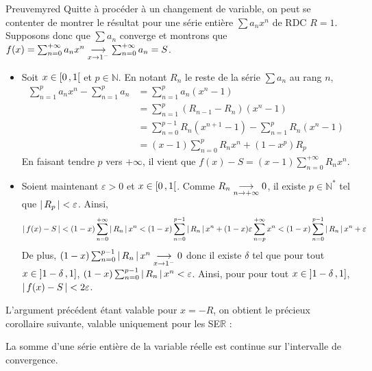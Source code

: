     \begin{demo}{Preuve}{myred}
        Quitte à procéder à un changement de variable, on peut se contenter de montrer le résultat pour une série entière $\sum a_n x^n$ de RDC $R = 1$. Supposons donc que $\sum a_n$ converge et montrons que $f(x) = \sum_{n = 0}^{+\infty} a_n x^n \underset{x \rightarrow 1^-}{\longrightarrow} \sum_{n=0}^{+\infty} a_n = S$.
        \begin{itemize}
            \item Soit $x \in \left[ 0 \, , 1 \right[$ et $p \in \mathbb{N}$. En notant $R_n$ le reste de la série $\sum a_n$ au rang $n$, 
            \begin{align*}
                \sum_{n=1}^{p} a_n x^n - \sum_{n=1}^{p} a_n 
                &= \sum_{n=1}^{p} a_n (x^n - 1) \\
                &= \sum_{n=1}^{p} (R_{n-1} - R_n)(x^n - 1) \\
                &= \sum_{n=0}^{p-1} R_n (x^{n+1} - 1) - \sum_{n=1}^{p} R_n (x^n - 1) \\
                &= (x-1) \sum_{n=0}^{p} R_n x^n + (1 - x^p) R_p 
            \end{align*}
            En faisant tendre $p$ vers $+\infty$, il vient que $f(x)- S = (x-1) \sum_{n=0}^{+\infty} R_n x^n$.
            \item Soient maintenant $\varepsilon > 0$ et $x \in \left[ 0 \, , 1 \right[$. Comme $R_n \underset{n \rightarrow +\infty}{\longrightarrow} 0$, il existe $p \in \mathbb{N}^*$ tel que $\left\lvert \,R_p \, \right\rvert < \varepsilon$. Ainsi, 
            \[ \left\lvert \,f(x) - S \, \right\rvert < (1 - x) \sum_{n=0}^{+\infty} \left\lvert \,R_n \, \right\rvert x^n < (1 - x) \sum_{n = 0}^{p-1} \left\lvert \,R_n \, \right\rvert x^n + (1 - x)\varepsilon \sum_{n=p}^{+\infty} x^n < (1 - x) \sum_{n=0}^{p-1} \left\lvert \,R_n \, \right\rvert x^n + \varepsilon \]  
            De plus, $(1-x) \sum_{n=0}^{p-1} \left\lvert \,R_n \, \right\rvert x^n \underset{x \rightarrow 1^-}{\longrightarrow} 0$ donc il existe $\delta$ tel que pour tout $x \in \left] 1 - \delta \, , 1 \right]$, $(1 - x) \sum_{n=0}^{p-1} \left\lvert \,R_n \, \right\rvert x^n < \varepsilon$. Ainsi, pour pour tout $x \in \left] 1 - \delta \, , 1 \right]$, $\left\lvert \,f(x) - S \, \right\rvert < 2 \varepsilon$.  
        \end{itemize}
    \end{demo}

    L’argument précédent étant valable pour $x = -R$, on obtient le précieux corollaire suivante, valable uniquement pour les SE$\mathbb{R}$ : 

    \begin{coro}{}{}
        La somme d’une série entière de la variable réelle est continue sur l’intervalle de convergence.
    \end{coro}

